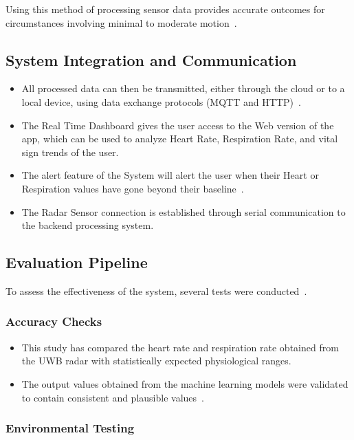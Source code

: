 \documentclass[conference]{IEEEtran}
\begin{document}
Using this method of processing sensor data provides accurate outcomes for circumstances involving minimal to moderate motion~\cite{ref6,ref19}.

\subsection{System Integration and Communication}

\begin{itemize}
\item All processed data can then be transmitted, either through the cloud or to a local device, using data exchange protocols (MQTT and HTTP)~\cite{ref18}.
\item The Real Time Dashboard gives the user access to the Web version of the app, which can be used to analyze Heart Rate, Respiration Rate, and vital sign trends of the user.
\item The alert feature of the System will alert the user when their Heart or Respiration values have gone beyond their baseline~\cite{ref20}.
\item The Radar Sensor connection is established through serial communication to the backend processing system.
\end{itemize}

\subsection{Evaluation Pipeline}

To assess the effectiveness of the system, several tests were conducted~\cite{ref3,ref4}.

\subsubsection{Accuracy Checks}

\begin{itemize}
\item This study has compared the heart rate and respiration rate obtained from the UWB radar with statistically expected physiological ranges.
\item The output values obtained from the machine learning models were validated to contain consistent and plausible values~\cite{ref18,ref19}.
\end{itemize}

\subsubsection{Environmental Testing}
\end{document}
